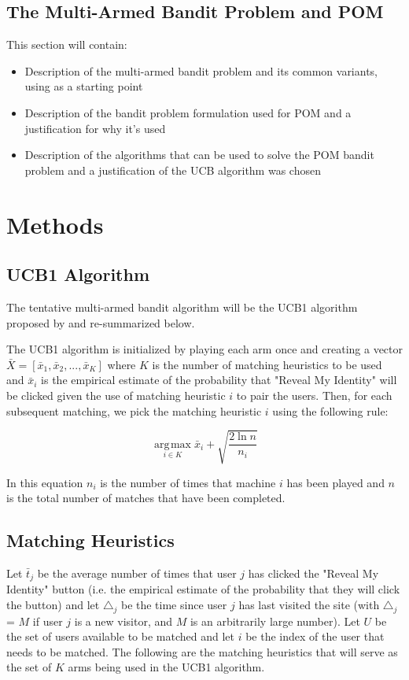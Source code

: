 \documentclass{article}
\DeclareMathOperator*{\argmax}{\arg\!\max}
\begin{document}
\subsection{The Multi-Armed Bandit Problem and POM}

This section will contain: 
\begin{itemize}
\item Description of the multi-armed bandit problem and its common variants, using \citet{bubeck12} as a starting point
\item Description of the bandit problem formulation used for POM and a justification for why it's used
\item Description of the algorithms that can be used to solve the POM bandit problem and a justification of the UCB algorithm was chosen
\end{itemize}

\section{Methods}

\subsection{UCB1 Algorithm}

The tentative multi-armed bandit algorithm will be the UCB1 algorithm proposed by \citep{auer02} and re-summarized below.

The UCB1 algorithm is initialized by playing each arm once and creating a vector $\bar{X} = [\bar{x}_1, \bar{x}_2, ..., \bar{x}_K]$ where $K$ is the number of matching heuristics to be used and 
$\bar{x}_i$ is the empirical estimate of the probability that "Reveal My Identity" will be clicked given the use of matching heuristic $i$ to pair the users. Then, for each subsequent matching, we pick the matching heuristic $i$ using the following rule: 

$$ \underset{i \in{K}}{\argmax{}} \bar{x}_i + \sqrt{\frac{2\ln{n}}{n_i}}$$

In this equation $n_i$ is the number of times that machine $i$ has been played and $n$ is the total number of matches that have been completed.

\subsection{Matching Heuristics}

Let $\bar{t}_j$ be the average number of times that user $j$ has clicked the "Reveal My Identity" button (i.e. the empirical estimate of the probability that they will click the button) and let $\triangle_j$ be the time since user $j$ has last visited the site (with $\triangle_j$ = $M$ if user $j$ is a new visitor, and $M$ is an arbitrarily large number). Let $U$ be the set of users available to be matched and let $i$ be the index of the user that needs to be matched. The following are the matching heuristics that will serve as the set of $K$ arms being used in the UCB1 algorithm.
\end{document}
